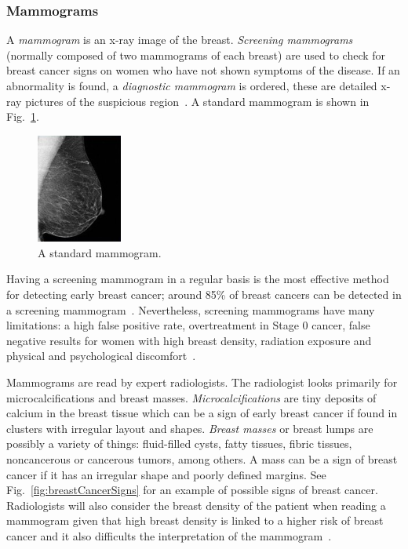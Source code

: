 \subsubsection{Mammograms}
A \emph{mammogram} is an x-ray image of the breast. \emph{Screening mammograms} (normally composed of two mammograms of each breast) are used to check for breast cancer signs on women who have not shown symptoms of the disease. If an abnormality is found, a \emph{diagnostic mammogram} is ordered, these are detailed x-ray pictures of the suspicious region~\cite{Mammograms2014}. A standard mammogram is shown in Fig.~\ref{fig:normalMammogram}.

\begin{figure}[h]
	\centering
	\includegraphics[width = 0.25\textwidth]{plots/normalMammogram.jpg}
	\caption[Digital Mammogram]{A standard mammogram.}
	\label{fig:normalMammogram}
\end{figure}

Having a screening mammogram in a regular basis is the most effective method for detecting early breast cancer; around 85\% of breast cancers can be detected in a screening mammogram~\cite{PerformanceMammography2013}. Nevertheless, screening mammograms have many limitations: a high false positive rate, overtreatment in Stage 0 cancer, false negative results for women with high breast density, radiation exposure and physical and psychological discomfort~\cite{Mammograms2014}.

Mammograms are read by expert radiologists. The radiologist looks primarily for microcalcifications and breast masses. \emph{Microcalcifications} are tiny deposits of calcium in the breast tissue which can be a sign of early breast cancer if found in clusters with irregular layout and shapes. \emph{Breast masses} or breast lumps are possibly a variety of things: fluid-filled cysts, fatty tissues, fibric tissues, noncancerous or cancerous tumors, among others. A mass can be a sign of breast cancer if it has an irregular shape and poorly defined margins. See Fig.~\ref{fig:breastCancerSigns} for an example of possible signs of breast cancer. Radiologists will also consider the breast density of the patient when reading a mammogram given that high breast density is linked to a higher risk of breast cancer and it also difficults the interpretation of the mammogram~\cite{MammogramsACS2014}.

